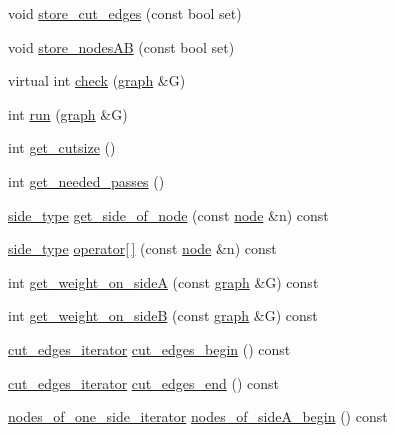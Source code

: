 \begin{DoxyCompactItemize}
\item 
void \mbox{\hyperlink{classfm__partition_ad0870674a1fb8e1c882f6855e32aec09}{store\+\_\+cut\+\_\+edges}} (const bool set)
\item 
void \mbox{\hyperlink{classfm__partition_a8926005b4637055d2acf6f29ad2d9b97}{store\+\_\+nodes\+AB}} (const bool set)
\item 
virtual int \mbox{\hyperlink{classfm__partition_af72a9fcc300ab0f202168c819b089e5d}{check}} (\mbox{\hyperlink{classgraph}{graph}} \&G)
\item 
int \mbox{\hyperlink{classfm__partition_a015b171fcaa01973ebe6c6a46a727097}{run}} (\mbox{\hyperlink{classgraph}{graph}} \&G)
\item 
int \mbox{\hyperlink{classfm__partition_a42fa2e19fb3fde093a1a05d0bd6d8ad1}{get\+\_\+cutsize}} ()
\item 
int \mbox{\hyperlink{classfm__partition_aa8aa84286a6939d17175fbf646ba3176}{get\+\_\+needed\+\_\+passes}} ()
\item 
\mbox{\hyperlink{classfm__partition_a7cdff1bea3740a287387e8408e16ca79}{side\+\_\+type}} \mbox{\hyperlink{classfm__partition_af5f6ad817fe30760f3bc5470bd70c4c9}{get\+\_\+side\+\_\+of\+\_\+node}} (const \mbox{\hyperlink{classnode}{node}} \&n) const
\item 
\mbox{\hyperlink{classfm__partition_a7cdff1bea3740a287387e8408e16ca79}{side\+\_\+type}} \mbox{\hyperlink{classfm__partition_a45ef6bc577ce894ead2c699678e26f1b}{operator\mbox{[}$\,$\mbox{]}}} (const \mbox{\hyperlink{classnode}{node}} \&n) const
\item 
int \mbox{\hyperlink{classfm__partition_a3f1ddcff1ba7a4c4090f947f918b5331}{get\+\_\+weight\+\_\+on\+\_\+sideA}} (const \mbox{\hyperlink{classgraph}{graph}} \&G) const
\item 
int \mbox{\hyperlink{classfm__partition_a9e380da1dc654fcffdf4ac2418c6ef80}{get\+\_\+weight\+\_\+on\+\_\+sideB}} (const \mbox{\hyperlink{classgraph}{graph}} \&G) const
\item 
\mbox{\hyperlink{classfm__partition_aede10aea3dda6be8014ce60fca728efe}{cut\+\_\+edges\+\_\+iterator}} \mbox{\hyperlink{classfm__partition_a36990b62c6d2d9e4948f42d805afc626}{cut\+\_\+edges\+\_\+begin}} () const
\item 
\mbox{\hyperlink{classfm__partition_aede10aea3dda6be8014ce60fca728efe}{cut\+\_\+edges\+\_\+iterator}} \mbox{\hyperlink{classfm__partition_af213672f08e03878183659fa8c2ed61e}{cut\+\_\+edges\+\_\+end}} () const
\item 
\mbox{\hyperlink{classfm__partition_ac8b7b5253476118e5f7bbad2fe8af285}{nodes\+\_\+of\+\_\+one\+\_\+side\+\_\+iterator}} \mbox{\hyperlink{classfm__partition_adad3bf33efb4a2b1b0feadeafb33f5fd}{nodes\+\_\+of\+\_\+side\+A\+\_\+begin}} () const

\end{DoxyCompactItemize}
